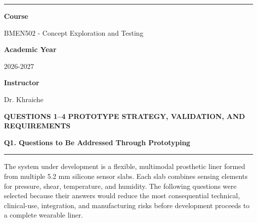 \documentclass[11pt,a4paper]{article}
\newcommand{\sectiontitle}[1]{%
  \vspace{0.4em}%
  {\color{AUBRed}\Large\bfseries #1}\par
  \vspace{0.25em}%
  {\color{AUBBlack}\rule{\textwidth}{0.8pt}}\par
  \vspace{0.45em}%
}
\begin{document}
\begin{titlepage}
  \vfill
  {\color{AUBRed}\rule{\textwidth}{0.8pt}}\par
  \vspace{4mm}
  \begin{minipage}[t]{0.49\textwidth}
    \small\color{AUBGray}
    \textbf{Course}\par
    BMEN502 - Concept Exploration and Testing
  \end{minipage}\hfill
  \begin{minipage}[t]{0.46\textwidth}
    \raggedleft\small\color{AUBGray}
    \textbf{Academic Year}\par
    2026-2027\par
    \textbf{Instructor}\par
    Dr. Khraiche
  \end{minipage}

  \vspace{7mm}
  {\small\bfseries\color{AUBRed}QUESTIONS 1--4 \textbar{} PROTOTYPE STRATEGY, VALIDATION, AND REQUIREMENTS}
\end{titlepage}
\hypersetup{pageanchor=true}
\setcounter{page}{1}

\sectiontitle{Q1. Questions to Be Addressed Through Prototyping}

{\fontsize{10}{11.8}\selectfont
The system under development is a flexible, multimodal prosthetic liner formed
from multiple 5.2 mm silicone sensor slabs. Each slab combines sensing elements
for pressure, shear, temperature, and humidity. The following questions were
selected because their answers would reduce the most consequential technical,
clinical-use, integration, and manufacturing risks before development proceeds
to a complete wearable liner.\par}

\vspace{0.1em}
\end{document}
